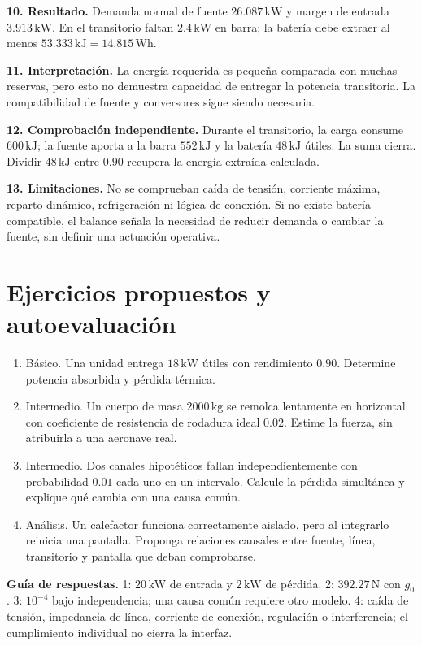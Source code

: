 \textbf{10. Resultado.} Demanda normal de fuente $26.087\,\mathrm{kW}$ y margen de entrada $3.913\,\mathrm{kW}$. En el transitorio faltan $2.4\,\mathrm{kW}$ en barra; la batería debe extraer al menos $53.333\,\mathrm{kJ}=14.815\,\mathrm{Wh}$.

\textbf{11. Interpretación.} La energía requerida es pequeña comparada con muchas reservas, pero esto no demuestra capacidad de entregar la potencia transitoria. La compatibilidad de fuente y conversores sigue siendo necesaria.

\textbf{12. Comprobación independiente.} Durante el transitorio, la carga consume $600\,\mathrm{kJ}$; la fuente aporta a la barra $552\,\mathrm{kJ}$ y la batería $48\,\mathrm{kJ}$ útiles. La suma cierra. Dividir $48\,\mathrm{kJ}$ entre $0.90$ recupera la energía extraída calculada.

\textbf{13. Limitaciones.} No se comprueban caída de tensión, corriente máxima, reparto dinámico, refrigeración ni lógica de conexión. Si no existe batería compatible, el balance señala la necesidad de reducir demanda o cambiar la fuente, sin definir una actuación operativa.

\section{Ejercicios propuestos y autoevaluación}
\begin{enumerate}
\item Básico. Una unidad entrega $18\,\mathrm{kW}$ útiles con rendimiento $0.90$. Determine potencia absorbida y pérdida térmica.
\item Intermedio. Un cuerpo de masa $2000\,\mathrm{kg}$ se remolca lentamente en horizontal con coeficiente de resistencia de rodadura ideal $0.02$. Estime la fuerza, sin atribuirla a una aeronave real.
\item Intermedio. Dos canales hipotéticos fallan independientemente con probabilidad $0.01$ cada uno en un intervalo. Calcule la pérdida simultánea y explique qué cambia con una causa común.
\item Análisis. Un calefactor funciona correctamente aislado, pero al integrarlo reinicia una pantalla. Proponga relaciones causales entre fuente, línea, transitorio y pantalla que deban comprobarse.
\end{enumerate}
\textbf{Guía de respuestas.} 1: $20\,\mathrm{kW}$ de entrada y $2\,\mathrm{kW}$ de pérdida. 2: $392.27\,\mathrm{N}$ con $g_0$. 3: $10^{-4}$ bajo independencia; una causa común requiere otro modelo. 4: caída de tensión, impedancia de línea, corriente de conexión, regulación o interferencia; el cumplimiento individual no cierra la interfaz.

